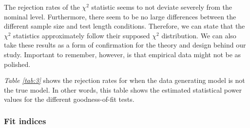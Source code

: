 \documentclass[Royal,sageapa,times,doublespace]{sagej}
\begin{document}
The rejection rates of the $\chi^2$ statistic seems to not deviate severely from the nominal level. Furthermore, there seem to be no large differences between the different sample size and test length conditions. Therefore, we can  state that the $\chi^2$ statistics approximately follow their supposed $\chi^2$ distribution. We can also take these results as a form of confirmation for the theory and design behind our study. Important to remember, however, is that empirical data might not be as polished.

\textit{Table \ref{tab:3}} shows the rejection rates for when the data generating model is not the true model. In other words, this table shows the estimated statistical power values for the different goodness-of-fit tests. 

\subsubsection{Fit indices}
\end{document}
